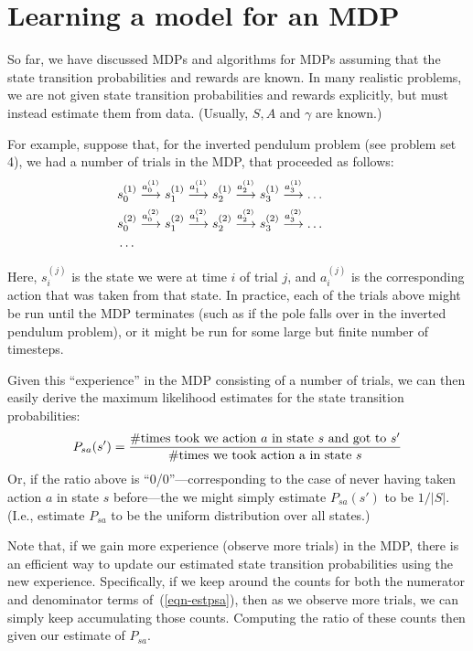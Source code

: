 \documentclass{article}
\begin{document}
\section{Learning a model for an MDP}

So far, we have discussed MDPs and algorithms for MDPs assuming that the
state transition probabilities and rewards are known.  In many realistic problems,
we are not given state transition probabilities and rewards explicitly, but
must instead estimate them from data.  (Usually, $S, A$ and $\gamma$ are known.)

For example, suppose that, for the inverted pendulum problem (see problem set 4),
we had a number of trials in the MDP, that proceeded as follows:
\begin{eqnarray*}
&s_0^{(1)} \stackrel{a_0^{(1)}}{\longrightarrow} s_1^{(1)}
\stackrel{a_1^{(1)}}{\longrightarrow} s_2^{(1)}
\stackrel{a_2^{(1)}}{\longrightarrow} s_3^{(1)}
\stackrel{a_3^{(1)}}{\longrightarrow} \ldots  \\
&s_0^{(2)} \stackrel{a_0^{(2)}}{\longrightarrow} s_1^{(2)}
\stackrel{a_1^{(2)}}{\longrightarrow} s_2^{(2)}
\stackrel{a_2^{(2)}}{\longrightarrow} s_3^{(2)}
\stackrel{a_3^{(2)}}{\longrightarrow} \ldots  \\
&\ldots  \hbox to 2.4in{}
\end{eqnarray*}

Here, $s_i^{(j)}$ is the state we were at time $i$ of trial $j$, and
$a_i^{(j)}$ is the corresponding action that was taken from that state.
In practice, each of the trials above might be run until the MDP terminates
(such as if the pole falls over in the inverted pendulum problem), or it might
be run for some large but finite number of timesteps.

Given this ``experience'' in the MDP consisting of a number of trials, we
can then easily derive the maximum likelihood estimates for the state
transition probabilities:
\begin{equation}
P_{sa}(s') = \frac{\hbox{\#times took we action $a$ in state $s$ and got to $s'$}}%
{\hbox{\#times we took action a in state $s$}}
\label{eqn-estpsa}
\end{equation}
Or, if the ratio above is ``0/0''---corresponding to the case of never having
taken action $a$ in state $s$ before---the we might simply estimate $P_{sa}(s')$ to
be $1/|S|$.  (I.e., estimate $P_{sa}$ to be the uniform distribution over all states.)

Note that, if we gain more experience (observe more trials) in the MDP, there is
an efficient way to update our estimated state transition probabilities using
the new experience.
Specifically, if we keep around the counts for both the numerator and
denominator terms of~(\ref{eqn-estpsa}), then as we observe more trials, we
can simply keep accumulating those counts.  Computing the ratio of these counts
then given our estimate of $P_{sa}$.
\end{document}

